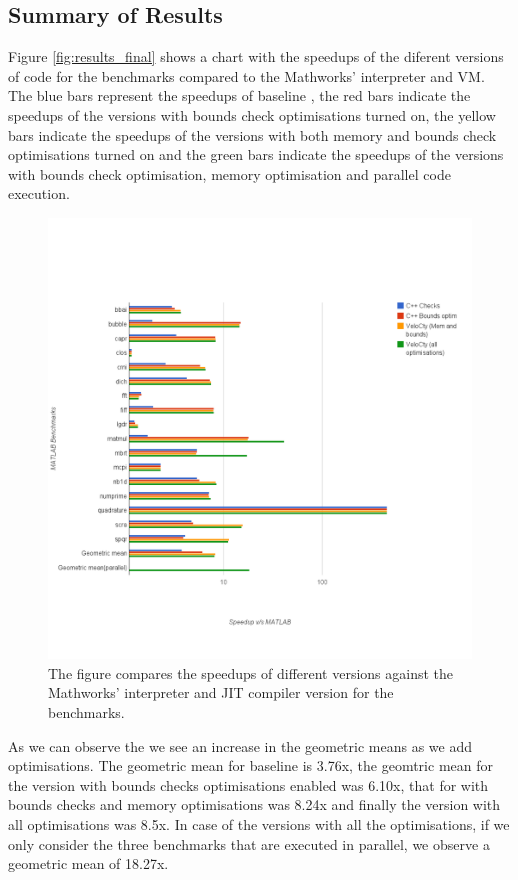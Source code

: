 \subsection{Summary of \matlab Results}
Figure \ref{fig:results_final} shows a chart with the speedups of the diferent versions of \velocty code for the \matlab benchmarks compared to the Mathworks' \matlab interpreter and VM. The blue bars represent the speedups of baseline \velocty, the red bars indicate the speedups of the \velocty versions with bounds check optimisations turned on, the yellow bars indicate the speedups of the \velocty versions with both memory and bounds check optimisations turned on and the green bars indicate the speedups of the \velocty versions with bounds check optimisation, memory optimisation and parallel code execution. 
\begin{figure}[htbp]
\centering
\includegraphics[scale=0.45]{Figures/final_mat.png}
\caption{The figure compares the speedups of different \velocty versions against the Mathworks' interpreter and JIT compiler version for the \matlab benchmarks.}
\label{fig:results_mat}
\end{figure}

As we can observe the we see an increase in the geometric means as we add optimisations. The geometric mean for baseline \velocty is 3.76x, the geomtric mean for the \velocty version with bounds checks optimisations enabled was 6.10x, that for \velocty with bounds checks and memory optimisations was 8.24x and finally the version with all optimisations was 8.5x. In case of the \velocty versions with all the optimisations, if we only consider the three benchmarks that are executed in parallel, we observe a geometric mean of 18.27x.

